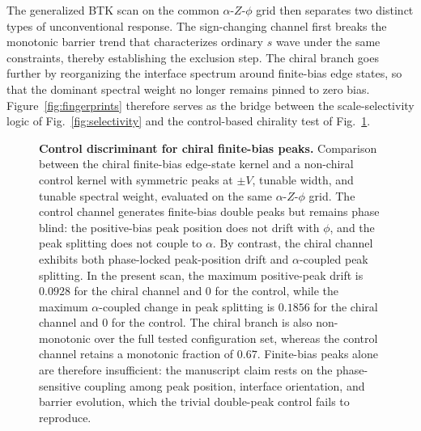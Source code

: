 \documentclass[aps,prl,twocolumn,superscriptaddress,longbibliography]{revtex4-2}
\begin{document}
The generalized BTK scan on the common $\alpha$-$Z$-$\phi$ grid then separates
two distinct types of unconventional response. The sign-changing channel first
breaks the monotonic barrier trend that characterizes ordinary $s$ wave under
the same constraints, thereby establishing the exclusion step. The chiral branch
goes further by reorganizing the interface spectrum around finite-bias edge
states, so that the dominant spectral weight no longer remains pinned to
zero bias. Figure~\ref{fig:fingerprints} therefore serves as the bridge between
the scale-selectivity logic of Fig.~\ref{fig:selectivity} and the control-based
chirality test of Fig.~\ref{fig:control}.

\begin{figure}[t]
  \centering
  \caption{\textbf{Control discriminant for chiral finite-bias peaks.}
  Comparison between the chiral finite-bias edge-state kernel and a non-chiral
  control kernel with symmetric peaks at $\pm V$, tunable width, and tunable
  spectral weight, evaluated on the same $\alpha$-$Z$-$\phi$ grid. The control
  channel generates finite-bias double peaks but remains phase blind: the
  positive-bias peak position does not drift with $\phi$, and the peak splitting
  does not couple to $\alpha$. By contrast, the chiral channel exhibits both
  phase-locked peak-position drift and $\alpha$-coupled peak splitting. In the
  present scan, the maximum positive-peak drift is $0.0928$ for the chiral
  channel and $0$ for the control, while the maximum $\alpha$-coupled change in
  peak splitting is $0.1856$ for the chiral channel and $0$ for the control.
  The chiral branch is also non-monotonic over the full tested configuration
  set, whereas the control channel retains a monotonic fraction of $0.67$.
  Finite-bias peaks alone are therefore insufficient: the manuscript claim rests
  on the phase-sensitive coupling among peak position, interface orientation,
  and barrier evolution, which the trivial double-peak control fails to
  reproduce.}
  \label{fig:control}
\end{figure}
\end{document}
